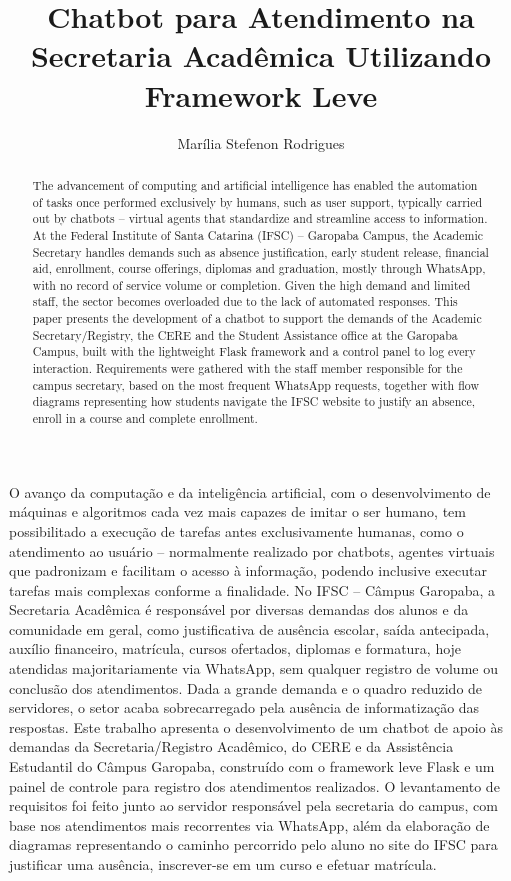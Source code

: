 \documentclass[12pt]{article}
\title{Chatbot para Atendimento na Secretaria Acadêmica Utilizando Framework Leve}
\author{Marília Stefenon Rodrigues\inst{1}}
\begin{document}
\maketitle

\begin{abstract}
The advancement of computing and artificial intelligence has enabled the
automation of tasks once performed exclusively by humans, such as user
support, typically carried out by chatbots -- virtual agents that
standardize and streamline access to information. At the Federal
Institute of Santa Catarina (IFSC) -- Garopaba Campus, the Academic
Secretary handles demands such as absence justification, early student
release, financial aid, enrollment, course offerings, diplomas and
graduation, mostly through WhatsApp, with no record of service volume or
completion. Given the high demand and limited staff, the sector becomes
overloaded due to the lack of automated responses. This paper presents
the development of a chatbot to support the demands of the Academic
Secretary/Registry, the CERE and the Student Assistance office at the
Garopaba Campus, built with the lightweight Flask framework and a
control panel to log every interaction. Requirements were gathered with the staff member
responsible for the campus secretary, based on the most frequent
WhatsApp requests, together with flow diagrams representing how students
navigate the IFSC website to justify an absence, enroll in a course and
complete enrollment.
\end{abstract}

\begin{resumo}
O avanço da computação e da inteligência artificial, com o
desenvolvimento de máquinas e algoritmos cada vez mais capazes de imitar
o ser humano, tem possibilitado a execução de tarefas antes
exclusivamente humanas, como o atendimento ao usuário -- normalmente
realizado por chatbots, agentes virtuais que padronizam e facilitam o
acesso à informação, podendo inclusive executar tarefas mais complexas
conforme a finalidade. No IFSC -- Câmpus Garopaba, a Secretaria
Acadêmica é responsável por diversas demandas dos alunos e da comunidade
em geral, como justificativa de ausência escolar, saída antecipada,
auxílio financeiro, matrícula, cursos ofertados, diplomas e formatura,
hoje atendidas majoritariamente via WhatsApp, sem qualquer registro de
volume ou conclusão dos atendimentos. Dada a grande demanda e o quadro
reduzido de servidores, o setor acaba sobrecarregado pela ausência de
informatização das respostas. Este trabalho apresenta o desenvolvimento
de um chatbot de apoio às demandas da Secretaria/Registro Acadêmico, do
CERE e da Assistência Estudantil do Câmpus Garopaba, construído com o
framework leve Flask e um
painel de controle para registro dos atendimentos realizados. O
levantamento de requisitos foi feito junto ao servidor responsável pela
secretaria do campus, com base nos atendimentos mais recorrentes via
WhatsApp, além da elaboração de diagramas representando o caminho
percorrido pelo aluno no site do IFSC para justificar uma ausência,
inscrever-se em um curso e efetuar matrícula.
\end{resumo}
\end{document}
